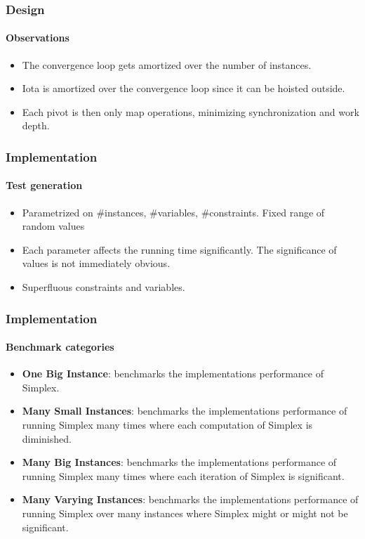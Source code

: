\documentclass{beamer}
\begin{document}
\begin{frame}
\frametitle{Design}
\framesubtitle{Observations}
\begin{itemize}
	\item The convergence loop gets amortized over the number of instances.
	
	\item Iota is amortized over the convergence loop since it can be hoisted outside.
	
	\item Each pivot is then only map operations, minimizing synchronization and work depth.
\end{itemize}
\end{frame}


\begin{frame}
	\frametitle{Implementation}
	\framesubtitle{Test generation}
	\begin{itemize}
		\item Parametrized on \#instances, \#variables, \#constraints. Fixed range of random values
		
		\item Each parameter affects the running time significantly. The significance of values is not immediately obvious.
		
		\item Superfluous constraints and variables.
	\end{itemize}
\end{frame}

\begin{frame}
\frametitle{Implementation}
\framesubtitle{Benchmark categories}
\begin{itemize}
	\item \textbf{One Big Instance}: benchmarks the implementations performance of Simplex.
	
	\item \textbf{Many Small Instances}: benchmarks the implementations performance of running Simplex many times where each computation of Simplex is diminished.
	
	\item \textbf{Many Big Instances}: benchmarks the implementations performance of running Simplex many times where each iteration of Simplex is significant.
	
	\item \textbf{Many Varying Instances}: benchmarks the implementations performance of running Simplex over many instances where Simplex might or might not be significant.
\end{itemize}
\end{frame}
\end{document}
